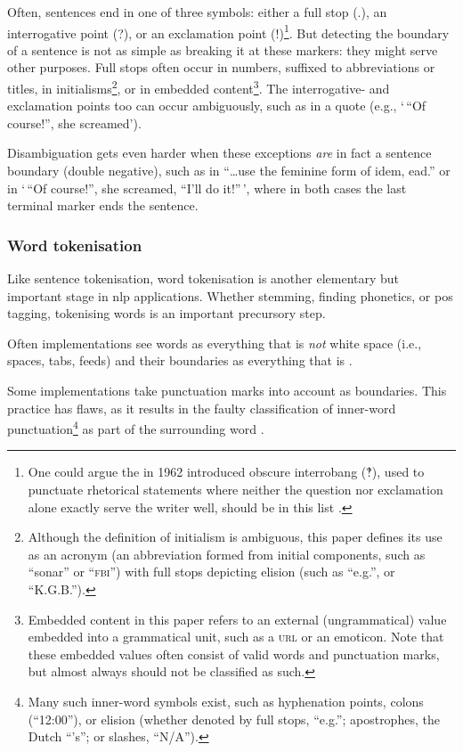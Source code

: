 Often, sentences end in one of three symbols: either a full stop (.),
  an interrogative point (?), or an exclamation point (!)\footnote{One
    could argue the in 1962 introduced
    obscure interrobang (‽), used to punctuate rhetorical statements where
    neither the question nor exclamation alone exactly serve the writer
    well, should be in this list \autocite{interrobang-mks.com}.}.
But detecting the boundary of a sentence is not as simple as breaking it at
  these markers: they might serve other purposes.
Full stops often occur in numbers, suffixed to abbreviations or titles,
  in initialisms\footnote{Although
    the definition of initialism is ambiguous, this paper defines its use
    as an acronym (an abbreviation formed from initial components, such as
    ``sonar'' or ``\textsc{fbi}'') with full stops depicting elision (such as
    ``e.g.'', or ``K.G.B.'').},
  or in embedded content\footnote{Embedded
    content in this paper refers to an external (ungrammatical) value
    embedded into a grammatical unit, such as a \textsc{url} or an emoticon.
    Note that these embedded values often consist of valid words and
    punctuation marks, but almost always should not be classified as such.}.
The interrogative- and exclamation points too can occur ambiguously, such as
  in a quote (e.g., `\,``Of course!'', she screamed').

Disambiguation gets even harder when these exceptions \emph{are} in fact a
  sentence boundary (double negative), such as in
  ``\ldots{}use the feminine form of idem, ead.'' or in
  `\,``Of course!'', she screamed, ``I'll do it!''\,', where in both
  cases the last terminal marker ends the sentence.

\subsubsection{Word tokenisation}\label{word-tokenisation}

Like sentence tokenisation, word tokenisation is another elementary but
important stage in \gls{nlp} applications. Whether stemming, finding
phonetics, or \gls{pos} tagging, tokenising words is an important
precursory step.

Often implementations see words as everything that is \emph{not} white
  space (i.e., spaces, tabs, feeds) and their boundaries as everything that
  is \autocite{loadfive/knwl-source-code}.

Some implementations take punctuation marks into account as boundaries.
This practice has flaws, as it results in the faulty classification of
  inner-word punctuation\footnote{Many such inner-word symbols exist, such
    as hyphenation points, colons (``12:00''), or elision (whether denoted
    by full stops, ``e.g.''; apostrophes, the Dutch ``'s''; or slashes,
    ``N/A'').}
  as part of the surrounding word \autocite{NaturalNode/natural-source-code}.

